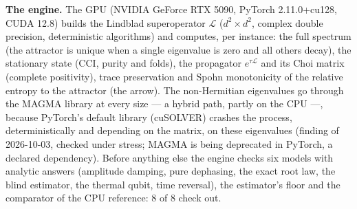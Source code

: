 \documentclass[11pt]{article}
\theoremstyle{definition}\newtheorem{deriv}{Derivation}
\begin{document}
\textbf{The engine.} The GPU (NVIDIA GeForce RTX 5090, PyTorch 2.11.0+cu128, CUDA 12.8) builds the Lindblad superoperator $\mathcal L$ ($d^2\times d^2$, complex double precision, deterministic algorithms) and computes, per instance: the full spectrum (the attractor is unique when a single eigenvalue is zero and all others decay), the stationary state (CCI, purity and folds), the propagator $e^{\tau\mathcal L}$ and its Choi matrix (complete positivity), trace preservation and Spohn monotonicity of the relative entropy to the attractor (the arrow). The non-Hermitian eigenvalues go through the MAGMA library at every size --- a hybrid path, partly on the CPU ---, because PyTorch's default library (cuSOLVER) crashes the process, deterministically and depending on the matrix, on these eigenvalues (finding of 2026-10-03, checked under stress; MAGMA is being deprecated in PyTorch, a declared dependency). Before anything else the engine checks six models with analytic answers (amplitude damping, pure dephasing, the exact root law, the blind estimator, the thermal qubit, time reversal), the estimator's floor and the comparator of the CPU reference: 8 of 8 check out.
\end{document}
